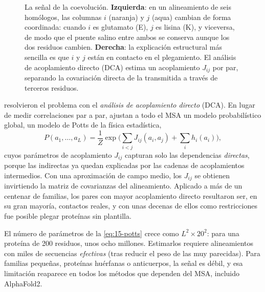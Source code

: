 \begin{figure}[t]
\centering

\caption[Coevolución y contactos]{La señal de la coevolución. \textbf{Izquierda}: en un alineamiento de seis homólogos, las columnas $i$ (naranja) y $j$ (aqua) cambian de forma coordinada: cuando $i$ es glutamato (E), $j$ es lisina (K), y viceversa, de modo que el puente salino entre ambos se conserva aunque los dos residuos cambien. \textbf{Derecha}: la explicación estructural más sencilla es que $i$ y $j$ están en contacto en el plegamiento. El análisis de acoplamiento directo (DCA) estima un acoplamiento $J_{ij}$ por par, separando la covariación directa de la transmitida a través de terceros residuos.}
\label{fig:15-coevol}
\end{figure}

\textcite{c15-morcos2011} resolvieron el problema con el \emph{análisis de acoplamiento directo} (DCA). En lugar de medir correlaciones par a par, ajustan a todo el MSA un modelo probabilístico global, un modelo de Potts de la física estadística,
\begin{equation}\label{eq:15-potts}
P(a_1,\dots,a_L)=\frac1Z\exp\!\Big(\sum_{i<j}J_{ij}(a_i,a_j)+\sum_i h_i(a_i)\Big),
\end{equation}
cuyos parámetros de acoplamiento $J_{ij}$ capturan solo las dependencias \emph{directas}, porque las indirectas ya quedan explicadas por las cadenas de acoplamientos intermedios. Con una aproximación de campo medio, los $J_{ij}$ se obtienen invirtiendo la matriz de covarianzas del alineamiento. Aplicado a más de un centenar de familias, los pares con mayor acoplamiento directo resultaron ser, en su gran mayoría, contactos reales, y con unas decenas de ellos como restricciones fue posible plegar proteínas sin plantilla.

\begin{simbolos}
\end{simbolos}

\begin{cuidado}
El número de parámetros de la \cref{eq:15-potts} crece como $L^2\times 20^2$: para una proteína de 200 residuos, unos ocho millones. Estimarlos requiere alineamientos con miles de secuencias \emph{efectivas} (tras reducir el peso de las muy parecidas). Para familias pequeñas, proteínas huérfanas o anticuerpos, la señal es débil, y esa limitación reaparece en todos los métodos que dependen del MSA, incluido AlphaFold2.
\end{cuidado}

